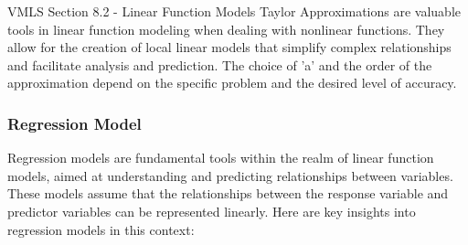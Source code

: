 \begin{notes}{VMLS Section 8.2 - Linear Function Models}
    Taylor Approximations are valuable tools in linear function modeling when dealing with nonlinear functions. They allow for the creation of local linear models that simplify complex relationships and 
    facilitate analysis and prediction. The choice of 'a' and the order of the approximation depend on the specific problem and the desired level of accuracy.

    \subsubsection*{Regression Model}

    Regression models are fundamental tools within the realm of linear function models, aimed at understanding and predicting relationships between variables. These models assume that the relationships 
    between the response variable and predictor variables can be represented linearly. Here are key insights into regression models in this context:


\end{notes}
